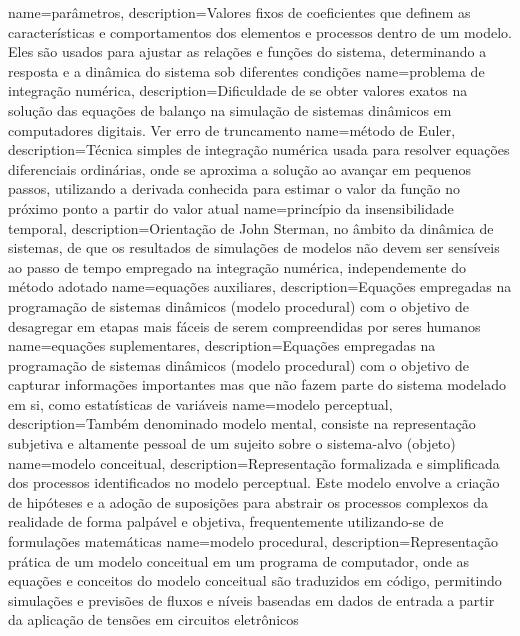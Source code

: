 {
    name=parâmetros,
    description={Valores fixos de coeficientes que definem as características e comportamentos dos elementos e processos dentro de um modelo. Eles são usados para ajustar as relações e funções do sistema, determinando a resposta e a dinâmica do sistema sob diferentes condições}
}
{
    name=problema de integração numérica,
    description={Dificuldade de se obter valores exatos na solução das equações de balanço na simulação de sistemas dinâmicos em computadores digitais. Ver erro de truncamento}
}
{
    name=método de Euler,
    description={Técnica simples de integração numérica usada para resolver equações diferenciais ordinárias, onde se aproxima a solução ao avançar em pequenos passos, utilizando a derivada conhecida para estimar o valor da função no próximo ponto a partir do valor atual}
}
{
    name=princípio da insensibilidade temporal,
    description={Orientação de John Sterman, no âmbito da dinâmica de sistemas, de que os resultados de simulações de modelos não devem ser sensíveis ao passo de tempo empregado na integração numérica, independemente do método adotado}
}
{
    name=equações auxiliares,
    description={Equações empregadas na programação de sistemas dinâmicos (modelo procedural) com o objetivo de desagregar em etapas mais fáceis de serem compreendidas por seres humanos}
}
{
    name=equações suplementares,
    description={Equações empregadas na programação de sistemas dinâmicos (modelo procedural) com o objetivo de capturar informações importantes mas que não fazem parte do sistema modelado em si, como estatísticas de variáveis}
}
{
    name=modelo perceptual,
    description={Também denominado modelo mental, consiste na representação subjetiva e altamente pessoal de um sujeito sobre o sistema-alvo (objeto)}
}
{
    name=modelo conceitual,
    description={Representação formalizada e simplificada dos processos identificados no modelo perceptual. Este modelo envolve a criação de hipóteses e a adoção de suposições para abstrair os processos complexos da realidade de forma palpável e objetiva, frequentemente utilizando-se de formulações matemáticas}
}
{
    name=modelo procedural,
    description={Representação prática de um modelo conceitual em um programa de computador, onde as equações e conceitos do modelo conceitual são traduzidos em código, permitindo simulações e previsões de fluxos e níveis baseadas em dados de entrada a partir da aplicação de tensões em circuitos eletrônicos}
}
